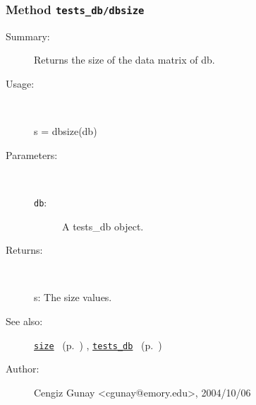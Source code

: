 \subsubsection[Method \texttt{dbsize}]{Method \texttt{tests\_db/dbsize}}%
%
\label{ref_tests_db__dbsize}%
\hypertarget{ref_tests_db__dbsize}{}%
\begin{description}
\item[Summary:]Returns the size of the data matrix of db.
%
\item[Usage:]~%
\begin{lyxcode}%
s = dbsize(db)
%
\end{lyxcode}%
%
%
\item[Parameters:]~
\begin{description}%
\item[\texttt{db}:]
 A tests\_db object.
\end{description}%
%
\item[Returns:]~

	s: The size values.
%
%
\item[See also:]%
\hyperlink{ref_size}{\texttt{size}}%
\ (p.~\pageref{ref_size})%
%
, \hyperlink{ref_tests_db}{\texttt{tests\_db}}%
\ (p.~\pageref{ref_tests_db})%
%
%
\item[Author:]%
Cengiz Gunay <cgunay@emory.edu>, 2004/10/06%
\end{description}
\methodline%
